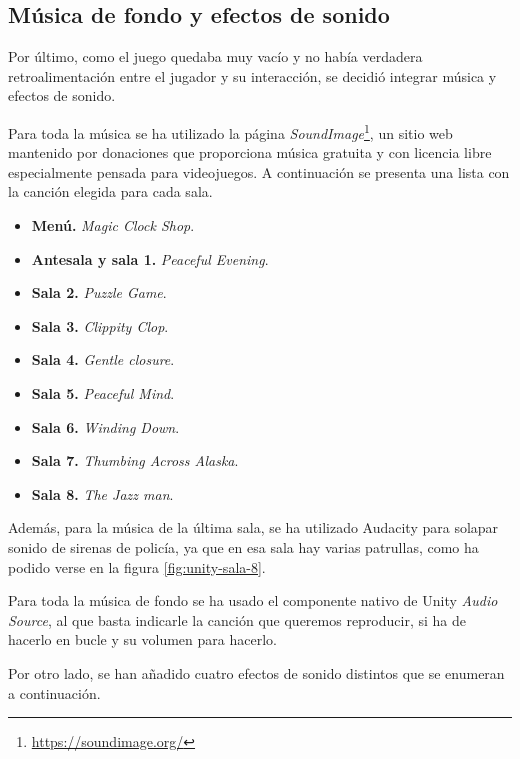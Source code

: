 \subsection{Música de fondo y efectos de sonido}

Por último, como el juego quedaba muy vacío y no había verdadera retroalimentación entre el jugador y su interacción, se decidió integrar música y efectos de sonido.

Para toda la música se ha utilizado la página \textit{SoundImage}\footnote{\url{https://soundimage.org/}}, un sitio web mantenido por donaciones que proporciona música gratuita y con licencia libre especialmente pensada para videojuegos. A continuación se presenta una lista con la canción elegida para cada sala.

\begin{itemize}
    \item \textbf{Menú.} \textit{Magic Clock Shop}.
    \item \textbf{Antesala y sala 1.} \textit{Peaceful Evening}.
    \item \textbf{Sala 2.} \textit{Puzzle Game}.
    \item \textbf{Sala 3.} \textit{Clippity Clop}.
    \item \textbf{Sala 4.} \textit{Gentle closure}.
    \item \textbf{Sala 5.} \textit{Peaceful Mind}.
    \item \textbf{Sala 6.} \textit{Winding Down}.
    \item \textbf{Sala 7.} \textit{Thumbing Across Alaska}.
    \item \textbf{Sala 8.} \textit{The Jazz man}.
\end{itemize}

Además, para la música de la última sala, se ha utilizado Audacity para solapar sonido de sirenas de policía, ya que en esa sala hay varias patrullas, como ha podido verse en la figura \ref{fig:unity-sala-8}.

Para toda la música de fondo se ha usado el componente nativo de Unity \textit{Audio Source}, al que basta indicarle la canción que queremos reproducir, si ha de hacerlo en bucle y su volumen para hacerlo.

Por otro lado, se han añadido cuatro efectos de sonido distintos que se enumeran a continuación.

